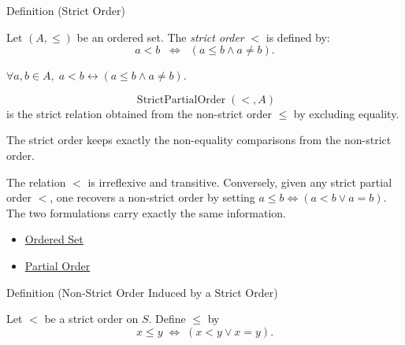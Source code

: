\begin{definitionbox}{Definition (Strict Order)}
\begin{definition}\label{def:strict-order}
Let $(A,\leq)$ be an ordered set. The \emph{strict order} $<$ is defined by:
\[
a < b \;\;\Longleftrightarrow\;\; (a \leq b \land a \neq b).
\]
\end{definition}
\end{definitionbox}

\begin{remark*}
$\forall a,b\in A,\; a<b \leftrightarrow (a\leq b\wedge a\neq b)$.
\end{remark*}

\begin{remark*}
\[
  \operatorname{StrictPartialOrder}(<,A)
\] is the strict relation obtained from
the non-strict order $\leq$ by excluding equality.
\end{remark*}

\begin{remark*}[Interpretation]
The strict order keeps exactly the non-equality comparisons from the
non-strict order.
\end{remark*}

\begin{remark*}[Exposition]
The relation $<$ is irreflexive and transitive. Conversely, given any strict
partial order $<$, one recovers a non-strict order by setting
$a \leq b \iff (a < b \lor a=b)$. The two formulations carry exactly the
same information.
\end{remark*}

\begin{dependencies}
\begin{itemize}
  \item \hyperref[def:ordered-set]{Ordered Set}
  \item \hyperref[def:partial-order]{Partial Order}
\end{itemize}
\end{dependencies}


\begin{definitionbox}{Definition (Non-Strict Order Induced by a Strict Order)}
\begin{definition}\label{def:non-strict-order-induced-by-strict-order}
Let $<$ be a strict order on $S$. Define $\leq$ by
\[
x\leq y \;\Longleftrightarrow\; (x<y\lor x=y).
\]
\end{definition}
\end{definitionbox}

